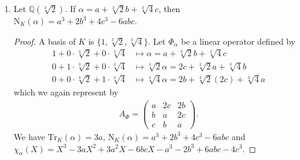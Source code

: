 \begin{example}
\begin{enumerate}
\begin{proof}
        \begin{align*}
            A_{\Phi} = \begin{pmatrix}
                a & db \\
                b & a
            \end{pmatrix} \text{.}
        \end{align*}
        We have \(\mathrm{Tr}_K(\alpha) = 2a\), \(\mathrm{N}_K(\alpha) = a^2 - db^2\), and \(\chi_\alpha(X) = X^2 - 2aX + a^2 - d b^2\) matching the results in our previous examples.
    \end{proof}
    \item Let \(\mathbb{Q}(\sqrt[3]{2})\). If \(\alpha = a + \sqrt[3]{2} b + \sqrt[3]{4} c\), then \(\mathrm{N}_K(\alpha) = a^3 + 2b^3 + 4c^3 - 6abc\).
    \begin{proof}
        A basis of \(K\) is \(\{1, \sqrt[3]{2}, \sqrt[3]{4}\}\). Let \(\Phi_\alpha\) be a linear operator defined by
        \begin{align*}
            1 + 0 \cdot \sqrt[3]{2} + 0 \cdot \sqrt[3]{4} &\mapsto \alpha = a + \sqrt[3]{2} b + \sqrt[3]{4} c \\
            0 + 1 \cdot \sqrt[3]{2} + 0 \cdot \sqrt[3]{4} &\mapsto \sqrt[3]{2} \alpha = 2 c + \sqrt[3]{2}a + \sqrt[3]{4} b \\
            0 + 0 \cdot \sqrt[3]{2} + 1 \cdot \sqrt[3]{4} & \mapsto \sqrt[3]{4} \alpha = 2b + \sqrt[3]{2} (2c) + \sqrt[3]{4} a
        \end{align*}
        which we again represent by
        \begin{align*}
            A_\Phi = 
            \begin{pmatrix}
                a & 2c & 2b \\
                b & a & 2c \\
                c & b & a
            \end{pmatrix} \text{.}
        \end{align*}
        We have \(\mathrm{Tr}_K(\alpha) = 3a\), \(\mathrm{N}_K(\alpha) = a^3 + 2b^3 + 4c^3 - 6abc\) and \(\chi_\alpha(X) = X^3 - 3aX^2 + 3a^2X - 6bcX - a^3 -2b^3 + 6abc - 4c^3\).
    \end{proof}
    \end{enumerate}
\end{example}

